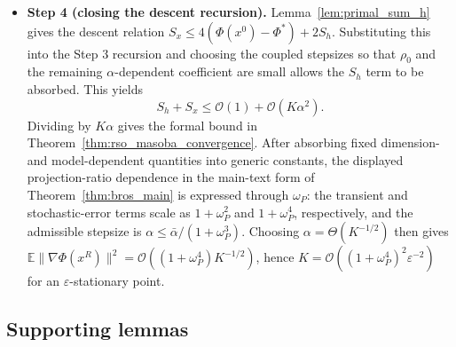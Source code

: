 \documentclass{pkumelon}
\theoremstyle{plain}
\newcommand{\E}{\mathbb{E}}
\newcommand{\Phiobj}{\Phi}
\begin{document}
\begin{itemize}[leftmargin=*]
\item \textbf{Step 4 (closing the descent recursion). } Lemma~\ref{lem:primal_sum_h} gives the descent relation $S_x\le 4(\Phiobj(x^0)-\Phiobj^*)+2S_h$. Substituting this into the Step 3 recursion and choosing the coupled stepsizes so that $\rho_0$ and the remaining $\alpha$-dependent coefficient are small allows the $S_h$ term to be absorbed. This yields
\begin{equation*}
S_h+S_x\le \mathcal O(1)+\mathcal O(K\alpha^2).
\end{equation*}
Dividing by $K\alpha$ gives the formal bound in Theorem~\ref{thm:rso_masoba_convergence}. After absorbing fixed dimension- and model-dependent quantities into generic constants, the displayed projection-ratio dependence in the main-text form of Theorem~\ref{thm:bros_main} is expressed through $\omega_P$: the transient and stochastic-error terms scale as $1+\omega_P^2$ and $1+\omega_P^4$, respectively, and the admissible stepsize is $\alpha\le \bar\alpha/(1+\omega_P^3)$. Choosing $\alpha=\Theta(K^{-1/2})$ then gives $\E\|\nabla\Phiobj(x^R)\|^2=\mathcal O((1+\omega_P^4)K^{-1/2})$, hence $K=\mathcal O((1+\omega_P^4)^2\varepsilon^{-2})$ for an $\varepsilon$-stationary point.
\end{itemize}

\subsection{Supporting lemmas}
\end{document}
